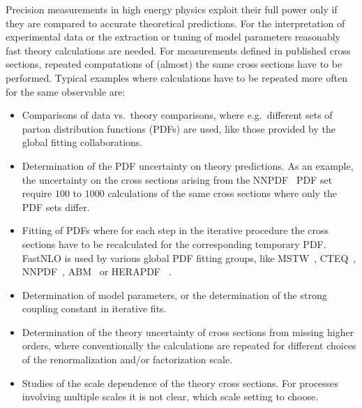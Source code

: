 \documentclass{DISproc}
\begin{document}
Precision measurements in high energy physics exploit their full power only if they are compared to accurate theoretical predictions.
For the interpretation of experimental data or the extraction or tuning of model parameters reasonably fast theory calculations are needed.
For measurements defined in published cross sections, repeated computations of (almost) the same cross sections have to be performed.
Typical examples where calculations have to be repeated more often for the same observable are:
\begin{itemize}
  \item 
  Comparisons of data vs.\ theory comparisons, where e.g.\ different sets of parton distribution functions (PDFs) are used, like those provided by the global fitting collaborations.
  \item Determination of the PDF uncertainty on theory predictions. 
  As an example, the uncertainty on the cross sections arising from the NNPDF~\cite{Ball:2011mu} PDF set require $100$ to $1000$ calculations of the same cross sections where only the PDF sets differ.
  \item 
  Fitting of PDFs where for each step in the iterative procedure the cross sections have to be recalculated for the corresponding temporary PDF.
  FastNLO is used by various global PDF fitting groups, like MSTW~\cite{Martin:2009iq}, CTEQ~\cite{Lai:2010vv}, NNPDF~\cite{Ball:2011mu}, ABM~\cite{Alekhin:2012ig} or HERAPDF~\cite{Nowak:12} .
  \item 
  Determination of model parameters, or the determination of the strong coupling constant in iterative fits.
  \item 
  Determination of the theory uncertainty of cross sections from missing higher orders, where conventionally the calculations are repeated for different choices of the renormalization and/or factorization scale.
  \item 
  Studies of the scale dependence of the theory cross sections. 
  For processes involving multiple scales it is not clear, which scale setting to choose.

\end{itemize}
\end{document}
